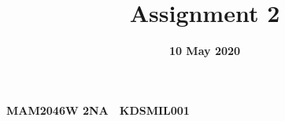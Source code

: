 \documentclass[12pt]{article}
\title{Assignment 2}
\date{\textbf{10 May 2020}}
\author{}
\begin{document}
    \begin{titlepage}
        \maketitle
        \center
        \textbf{\large{MAM2046W 2NA}}\ \
        \textbf{\large{KDSMIL001}}\ \
        \tableofcontents
    \end{titlepage}

    
\end{document}
